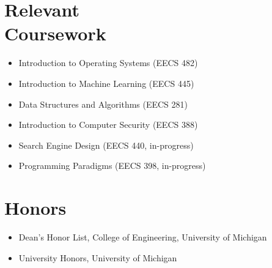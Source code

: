 \documentclass{mycv}
\begin{document}
\section{Relevant\\Coursework}
\begin{itemize}
  \item Introduction to Operating Systems (EECS 482)
  \item Introduction to Machine Learning (EECS 445)
  \item Data Structures and Algorithms (EECS 281)
  \item Introduction to Computer Security (EECS 388)
  \item Search Engine Design (EECS 440, in-progress)
  \item Programming Paradigms (EECS 398, in-progress)
\end{itemize}

\section{Honors}
\begin{itemize}
  \item Dean's Honor List, College of Engineering, University of Michigan
  \item University Honors, University of Michigan
\end{itemize}
\end{document}
